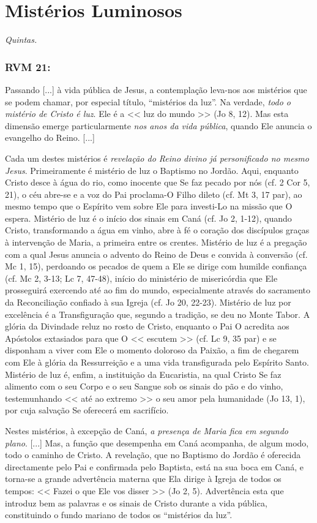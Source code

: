 \documentclass[10pt,a5paper]{book}
\newcommand{\from}[1]{\subsection*{#1}}
\begin{document}

\chapter{Mistérios Luminosos}

\emph{Quintas.}

\from{RVM 21:}

Passando [...] à vida pública de Jesus, a contemplação leva-nos aos mistérios que se podem chamar, por especial título, ``mistérios da luz''.
Na verdade, \emph{todo o mistério de Cristo é luz}.
Ele é a << luz do mundo >> (Jo 8, 12).
Mas esta dimensão emerge particularmente \emph{nos anos da vida pública}, quando Ele anuncia o evangelho do Reino.
[...]

Cada um destes mistérios é \emph{revelação do Reino divino já personificado no mesmo Jesus}.
Primeiramente é mistério de luz o Baptismo no Jordão.
Aqui, enquanto Cristo desce à água do rio, como inocente que Se faz pecado por nós (cf. 2 Cor 5, 21), o céu abre-se e a voz do Pai proclama-O Filho dileto (cf. Mt 3, 17 par), ao mesmo tempo que o Espírito vem sobre Ele para
investi-Lo na missão que O espera.
Mistério de luz é o início dos sinais em Caná (cf. Jo 2, 1-12), quando Cristo, transformando a água em vinho, abre à fé o coração dos discípulos graças à intervenção de Maria, a primeira entre os crentes.
Mistério de luz é a pregação com a qual Jesus anuncia o advento do Reino de Deus e convida à conversão (cf. Mc 1, 15), perdoando os pecados de quem a Ele se dirige com humilde confiança (cf. Mc 2, 3-13; Lc 7, 47-48), início do ministério de misericórdia que Ele prosseguirá exercendo até ao fim do mundo, especialmente através do
sacramento da Reconciliação confiado à sua Igreja (cf. Jo 20, 22-23).
Mistério de luz por excelência é a Transfiguração que, segundo a tradição, se deu no Monte Tabor.
A glória da Divindade reluz no rosto de Cristo, enquanto o Pai O acredita aos Apóstolos extasiados para que O << escutem >> (cf. Lc 9, 35 par) e se disponham a viver com Ele o momento doloroso da Paixão, a fim de chegarem com Ele à glória da Ressurreição e a uma vida transfigurada pelo Espírito Santo.
Mistério de luz é, enfim, a instituição da Eucaristia, na qual Cristo Se faz alimento com o seu Corpo e o seu Sangue sob os sinais do pão e do vinho, testemunhando << até ao extremo >> o seu amor pela humanidade (Jo 13, 1), por cuja salvação Se oferecerá em sacrifício.

Nestes mistérios, à excepção de Caná, \emph{a presença de Maria fica em segundo plano}.
[...]
Mas, a função que desempenha em Caná acompanha, de algum modo, todo o caminho de Cristo.
A revelação, que no Baptismo do Jordão é oferecida directamente pelo Pai e confirmada pelo Baptista, está na sua boca em Caná, e torna-se a grande advertência materna que Ela dirige à Igreja de todos os tempos:
<< Fazei o que Ele vos disser >> (Jo 2, 5).
Advertência esta que introduz bem as palavras e os sinais de Cristo durante a vida pública, constituindo o fundo mariano de todos os ``mistérios da luz''.
\end{document}
